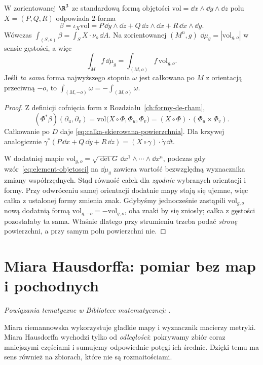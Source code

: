 \begin{stwierdzenie}
\label{prop:calka-skierowana-forma}
W zorientowanej $\R^3$ ze standardową
formą objętości $\mathrm{vol}=\dd x\wedge\dd y
\wedge\dd z$ polu $X=(P,Q,R)$ odpowiada $2$-forma
\[
 \beta=\iota_X\mathrm{vol}
 =P\,\dd y\wedge\dd z+
  Q\,\dd z\wedge\dd x+
  R\,\dd x\wedge\dd y.
\]
Wówczas $\int_{(S,o)}\beta
=\int_S X\cdot\nu_o\,\dd A$.
Na zorientowanej $(M^n,g)$
$\dd\mu_g=|\mathrm{vol}_{g,o}|$ w sensie gęstości,
a więc
\[
 \int_M f\,\dd\mu_g
 =\int_{(M,o)}f\,\mathrm{vol}_{g,o}.
\]
Jeśli \emph{ta sama} forma najwyższego stopnia
$\omega$ jest całkowana po $M$ z orientacją
przeciwną $-o$, to
$\int_{(M,-o)}\omega=-\int_{(M,o)}\omega$.
\end{stwierdzenie}
\begin{proof}
Z definicji cofnięcia form z
Rozdziału~\ref{ch:formy-de-rham},
\[
 (\Phi^*\beta)(\partial_u,\partial_v)
 =\mathrm{vol}\bigl(X\circ\Phi,\Phi_u,\Phi_v\bigr)
 =(X\circ\Phi)\cdot(\Phi_u\times\Phi_v).
\]
Całkowanie po $D$ daje
\eqref{eq:calka-skierowana-powierzchnia}.
Dla krzywej analogicznie
$\gamma^*(P\,\dd x+Q\,\dd y+R\,\dd z)
=(X\circ\gamma)\cdot\dot\gamma\,\dd t$.

W dodatniej mapie
$\mathrm{vol}_{g,o}=\sqrt{\det G}\,
\dd x^1\wedge\cdots\wedge\dd x^n$,
podczas gdy wzór~\eqref{eq:element-objetosci}
na $\dd\mu_g$ zawiera wartość bezwzględną
wyznacznika zmiany współrzędnych. Stąd
równość całek dla \emph{zgodnie} wybranych
orientacji i formy. Przy odwróceniu samej
orientacji dodatnie mapy stają się ujemne,
więc całka z ustalonej formy zmienia znak.
Gdybyśmy jednocześnie zastąpili
$\mathrm{vol}_{g,o}$ nową dodatnią formą
$\mathrm{vol}_{g,-o}=-\mathrm{vol}_{g,o}$,
oba znaki by się zniosły; całka z gęstości
pozostałaby ta sama. Właśnie dlatego
przy strumieniu trzeba podać \emph{stronę}
powierzchni, a przy samym polu powierzchni nie.
\end{proof}

\section{Miara Hausdorffa: pomiar bez map i pochodnych}
\label{sec:miara-hausdorffa}

\noindent\emph{Powiązania tematyczne w Bibliotece matematycznej:} .


Miara riemannowska wykorzystuje gładkie mapy
i wyznacznik macierzy metryki. Miara Hausdorffa
wychodzi tylko od \emph{odległości}: pokrywamy zbiór
coraz mniejszymi częściami i sumujemy odpowiednie
potęgi ich średnic. Dzięki temu ma sens również
na zbiorach, które nie są rozmaitościami.

